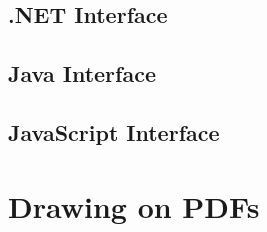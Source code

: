 \documentclass{book}
\begin{document}
\begin{dotnetcpdflib}
\clearpage
\section*{.NET Interface}
\begin{small}\tt

\end{small}
\end{dotnetcpdflib}

\begin{jcpdflib}
\clearpage
\section*{Java Interface}
\begin{small}\tt

\end{small}
\end{jcpdflib}

\begin{jscpdflib}
\clearpage
\section*{JavaScript Interface}
\begin{small}\tt

\end{small}
\end{jscpdflib}

\clearpage\pagestyle{empty}
\chapter{Drawing on PDFs}\label{chap:18}\pagestyle{fancy}
\end{document}
